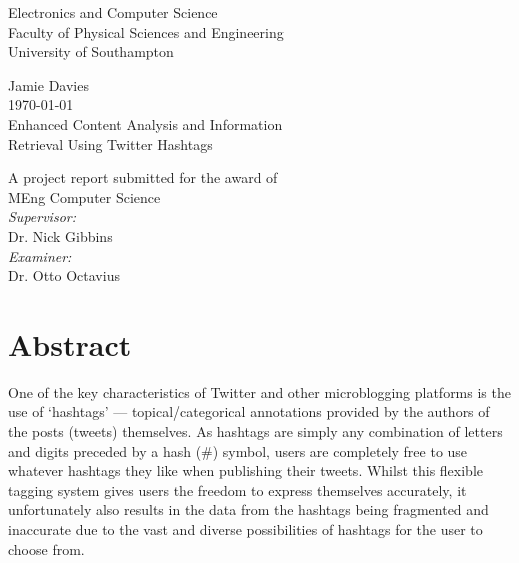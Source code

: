 \documentclass[12pt,a4paper]{article}
\begin{document}
\begin{titlepage}
\center
\vspace*{3cm}

{\Large
    Electronics and Computer Science\\
    Faculty of Physical Sciences and Engineering\\
    University of Southampton\\[1cm]
}

Jamie Davies\\
\today\\[1cm]

{\large
    Enhanced Content Analysis and Information\\
    Retrieval Using Twitter Hashtags\\[1cm]
}

A project report submitted for the award of\\
MEng Computer Science\\[1cm]

\emph{Supervisor:}\\
Dr. Nick Gibbins\\[0.5cm]

\emph{Examiner:}\\
Dr. Otto Octavius\\


\vfill
\end{titlepage}

\setcounter{secnumdepth}{0}
\section{Abstract}
One of the key characteristics of Twitter and other microblogging platforms is the use of `hashtags' --- topical/categorical annotations provided by the authors of the posts (tweets) themselves. As hashtags are simply any combination of letters and digits preceded by a hash (#) symbol, users are completely free to use whatever hashtags they like when publishing their tweets. Whilst this flexible tagging system gives users the freedom to express themselves accurately, it unfortunately also results in the data from the hashtags being fragmented and inaccurate due to the vast and diverse possibilities of hashtags for the user to choose from.
\end{document}
